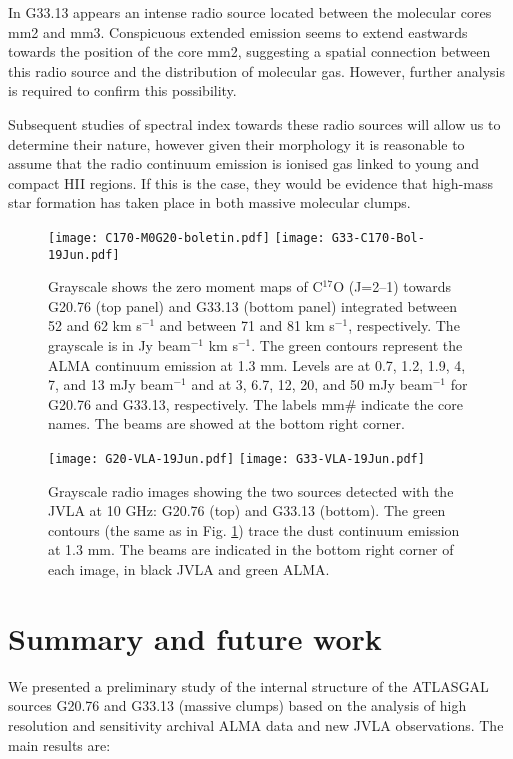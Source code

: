 \documentclass[baaa]{baaa}
\begin{document}
In G33.13 appears an intense radio source located between the molecular cores mm2 and mm3. Conspicuous extended emission seems to extend eastwards towards the position of the core mm2, suggesting a spatial connection between this radio source and the distribution of molecular gas. However, further analysis is required to confirm this possibility.

Subsequent studies of spectral index towards these radio sources  will allow us to determine their nature, however given their morphology it is reasonable to assume that the radio continuum emission is ionised gas linked to young and compact HII regions. If this is the case, they would be evidence that high-mass star formation has taken place in both massive molecular clumps. 



\begin{figure}[!t]
\centering
\texttt{[image: C170-M0G20-boletin.pdf]}
\texttt{[image: G33-C170-Bol-19Jun.pdf]}
\caption{Grayscale shows the zero moment maps of C$^{17}$O (J=2--1) towards G20.76 (top panel) and G33.13 (bottom panel) integrated between 52 and 62 km s$^{-1}$ and between 71 and 81 km s$^{-1}$, respectively. The grayscale is in Jy beam$^{-1}$ km s$^{-1}$. The green contours represent the ALMA continuum emission at 1.3 mm. Levels are at 0.7, 1.2, 1.9, 4, 7, and 13 mJy beam$^{-1}$ and at 3, 6.7, 12, 20, and 50 mJy beam$^{-1}$ for G20.76 and G33.13, respectively. The labels mm\# indicate the core names. The beams are showed at the bottom right corner.}
\label{C17O}
\end{figure}

 
\begin{figure}[!t]
\centering
\texttt{[image: G20-VLA-19Jun.pdf]}
\texttt{[image: G33-VLA-19Jun.pdf]}
\caption{Grayscale radio images showing the two sources detected with the JVLA at 10 GHz: G20.76 (top) and G33.13 (bottom). The green contours (the same as in Fig. \ref{C17O}) trace the dust continuum emission at 1.3 mm. The beams are indicated in the bottom right corner of each image, in black JVLA and green ALMA.}
\label{VLA}
\end{figure}


\section{Summary and future work }

We presented a preliminary study of the internal structure of the ATLASGAL sources G20.76 and G33.13 (massive clumps) based on the analysis of high resolution and sensitivity archival ALMA data and new JVLA observations. The main results are:
\end{document}
